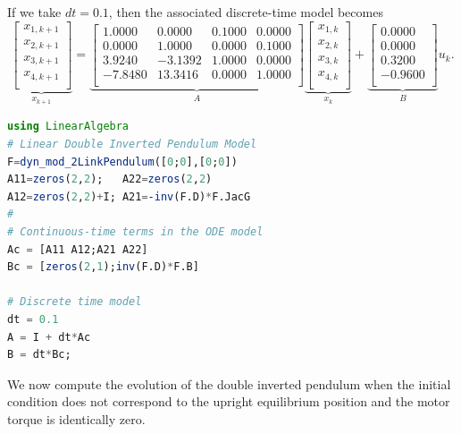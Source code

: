 If we take $dt = 0.1$, then the associated discrete-time model becomes 
 \begin{equation}
\label{eq:DTLinearizedDoubleInvertedPendulum}
 \underbrace{ \left[
\begin{array}{r}
x_{1,k+1} \\
x_{2,k+1}  \\
x_{3,k+1}  \\
x_{4,k+1}  \\
\end{array}
\right]}_{x_{k+1}} = \underbrace{\left[
\begin{array}{rrrr}
1.0000 & 0.0000 & 0.1000 & 0.0000 \\
0.0000 & 1.0000 & 0.0000 & 0.1000 \\
3.9240 & -3.1392 & 1.0000 & 0.0000 \\
-7.8480 & 13.3416 & 0.0000 & 1.0000 \\
\end{array}
\right]}_{A} \underbrace{\left[
\begin{array}{r}
x_{1,k} \\
x_{2,k}  \\
x_{3,k}  \\
x_{4,k}  \\
\end{array}
\right]}_{x_k} + \underbrace{\left[
\begin{array}{r}
0.0000 \\
0.0000 \\
0.3200 \\
-0.9600 \\
\end{array}
\right]}_{B} u_k.
\end{equation}

\begin{lstlisting}[language=Julia,style=mystyle]
using LinearAlgebra
# Linear Double Inverted Pendulum Model 
F=dyn_mod_2LinkPendulum([0;0],[0;0])
A11=zeros(2,2);   A22=zeros(2,2)
A12=zeros(2,2)+I; A21=-inv(F.D)*F.JacG
#
# Continuous-time terms in the ODE model
Ac = [A11 A12;A21 A22]
Bc = [zeros(2,1);inv(F.D)*F.B]

# Discrete time model
dt = 0.1
A = I + dt*Ac
B = dt*Bc;
\end{lstlisting}

We now compute the evolution of the double inverted pendulum when the initial condition does not correspond to the upright equilibrium position and the motor torque is identically zero. \\

